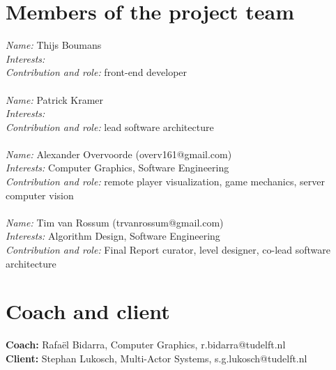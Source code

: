 \documentclass[]{article}
\begin{document}
\section*{Members of the project team}
\textit{Name:} Thijs Boumans\\
\textit{Interests:}\\
\textit{Contribution and role:} front-end developer\\
\\
\textit{Name:} Patrick Kramer\\
\textit{Interests:}\\
\textit{Contribution and role:} lead software architecture\\
\\
\textit{Name:} Alexander Overvoorde (overv161@gmail.com)\\
\textit{Interests:} Computer Graphics, Software Engineering\\
\textit{Contribution and role:} remote player visualization, game mechanics, server computer vision\\
\\
\textit{Name:} Tim van Rossum (trvanrossum@gmail.com)\\
\textit{Interests:} Algorithm Design, Software Engineering \\
\textit{Contribution and role:} Final Report curator, level designer, co-lead software architecture\\

\section*{Coach and client}
\textbf{Coach:} Rafa\"el Bidarra, Computer Graphics, r.bidarra@tudelft.nl\\
\textbf{Client:} Stephan Lukosch, Multi-Actor Systems, s.g.lukosch@tudelft.nl
\end{document}
